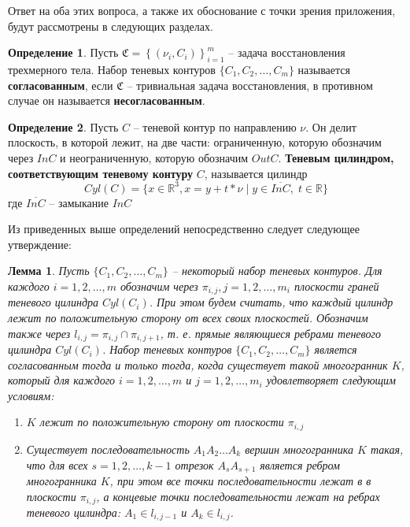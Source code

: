 \documentclass[a4paper, 12pt, titlepage]{article}
\theoremstyle{definition}
\newtheorem{SmartDefinition}{Определение}
\theoremstyle{plain}
\theoremstyle{plain}
\newtheorem{SmartLemma}{Лемма}
\begin{document}
Ответ на оба этих вопроса, а также их обоснование с точки зрения приложения,
будут рассмотрены в следующих разделах.

\begin{SmartDefinition}
 Пусть $\mathfrak{C} = \left\{(\nu_{i}, C_{i})\right\}_{i = 1}^{m}$ -- задача
 восстановления трехмерного тела. Набор теневых контуров
 $\{C_{1}, C_{2}, \ldots, C_{m}\}$ называется \textbf{согласованным}, если
 $\mathfrak{C}$ -- тривиальная задача восстановления, в противном случае он
 называется \textbf{несогласованным}.
\end{SmartDefinition}

\begin{SmartDefinition}
 Пусть $C$ -- теневой контур по направлению $\nu$. Он делит плоскость, в которой
 лежит, на две части: ограниченную, которую обозначим через $In C$ и
 неограниченную, которую обозначим $Out C$.
 \textbf{Теневым цилиндром, соответствующим теневому контуру} $C$, называется
 цилиндр
 \begin{equation}
  Cyl(C) = \{ x \in \mathbb{R}^{3}, x = y + t * \nu \; | \;
  y \in \overline{In C}, \; t \in \mathbb{R} \}
 \end{equation}
 где $\overline{In C}$ -- замыкание $In C$
\end{SmartDefinition}

Из приведенных выше определений непосредственно следует следующее утверждение:

\begin{SmartLemma}
 Пусть $\{C_{1}, C_{2}, \ldots, C_{m}\}$ -- некоторый набор теневых контуров.
 Для каждого $i = 1, 2, \ldots, m$ обозначим через
 $\pi_{i, j}, j = 1, 2, \ldots, m_{i}$ плоскости граней теневого цилиндра
 $Cyl(C_{i})$. При этом будем считать, что каждый цилиндр лежит по положительную
 сторону от всех своих плоскостей. Обозначим также через
 $l_{i, j} = \pi_{i, j} \cap \pi_{i, j + 1}$, т. е. прямые являющиеся ребрами
 теневого цилиндра $Cyl(C_{i})$.
 Набор теневых контуров $\{C_{1}, C_{2}, \ldots, C_{m}\}$ является согласованным
 тогда и только тогда, когда существует такой многогранник $K$, который для
 каждого $i = 1, 2, \ldots, m$ и $j = 1, 2, \ldots, m_{i}$ удовлетворяет
 следующим условиям:
 \begin{enumerate}
  \item $K$ лежит по положительную сторону от плоскости $\pi_{i, j}$
  \item Существует последовательность $A_{1} A_{2} \ldots A_{k}$ вершин
  многогранника $K$ такая, что для всех $s = 1, 2, \ldots, k - 1$ отрезок
  $A_{s} A_{s + 1}$ является ребром многогранника $K$, при этом все точки
  последовательности лежат в в плоскости $\pi_{i, j}$, а концевые точки 
  последовательности лежат на ребрах теневого цилиндра:
  $A_{1} \in l_{i, j - 1}$ и $A_{k} \in l_{i, j}$.
 \end{enumerate}
\end{SmartLemma}
\end{document}
